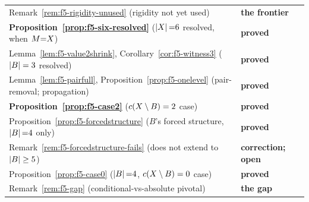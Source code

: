 \begin{center}
\begin{tabular}{@{}ll@{}}
Remark~\ref{rem:f5-rigidity-unused} (rigidity not yet used) & \textbf{the
  frontier} \\
\textbf{Proposition~\ref{prop:f5-six-resolved}} ($\left\lvert X\right\rvert{=}6$ resolved, when
  $M{=}X$) & \textbf{proved} \\
Lemma~\ref{lem:f5-value2shrink}, Corollary~\ref{cor:f5-witness3}
  ($\left\lvert B\right\rvert = 3$ resolved) & \textbf{proved} \\
Lemma~\ref{lem:f5-pairfull}, Proposition~\ref{prop:f5-onelevel}
  (pair-removal; propagation) & \textbf{proved} \\
\textbf{Proposition~\ref{prop:f5-case2}} ($c(X\setminus B)=2$ case)
  & \textbf{proved} \\
Proposition~\ref{prop:f5-forcedstructure} ($B$'s forced structure, $\left\lvert B\right\rvert{=}4$
  only) & \textbf{proved} \\
Remark~\ref{rem:f5-forcedstructure-fails} (does not extend to $\left\lvert B\right\rvert\ge5$)
  & \textbf{correction; open} \\
Proposition~\ref{prop:f5-case0} ($\left\lvert B\right\rvert{=}4$, $c(X\setminus B)=0$ case)
  & \textbf{proved} \\
Remark~\ref{rem:f5-gap} (conditional-vs-absolute pivotal) & \textbf{the gap} \\
\bottomrule
\end{tabular}
\end{center}

